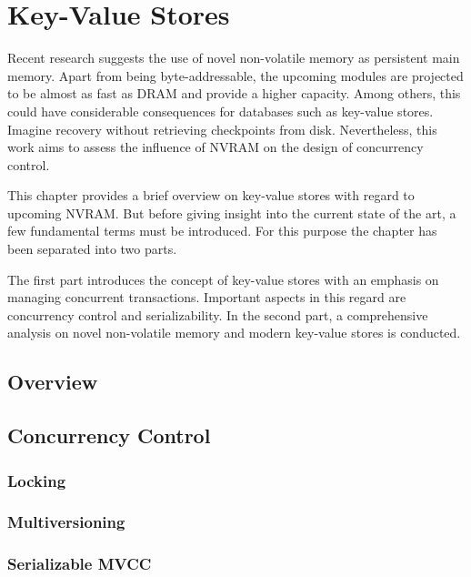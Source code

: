 \chapter{Key-Value Stores}
\label{ch:kvs}


Recent research suggests the use of novel non-volatile memory as persistent
main memory. Apart from being byte-addressable, the upcoming modules are
projected to be almost as fast as DRAM and provide a higher capacity. Among
others, this could have considerable consequences for databases such as
key-value stores. Imagine recovery without retrieving checkpoints from disk.
Nevertheless, this work aims to assess the influence of NVRAM on the design of
concurrency control.


This chapter provides a brief overview on key-value stores with regard to
upcoming NVRAM. But before giving insight into the current state of the art,
a few fundamental terms must be introduced. For this purpose the chapter has
been separated into two parts.


The first part introduces the concept of key-value stores with an emphasis on
managing concurrent transactions. Important aspects in this regard are
concurrency control and serializability. In the second part, a comprehensive
analysis on novel non-volatile memory and modern key-value stores is conducted.


%


%

\section{Overview}
\section{Concurrency Control}
\subsection{Locking}
\subsection{Multiversioning}
\subsection{Serializable MVCC}
